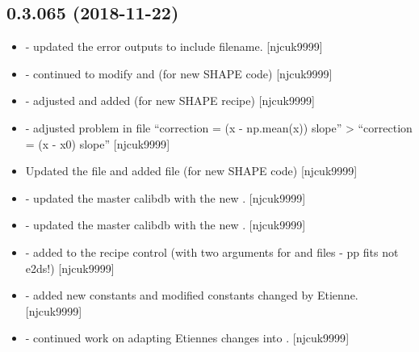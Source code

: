 \documentclass[a4paper,10pt,english]{report}
\begin{document}
\subsection{0.3.065 (2018-11-22)}
\label{\detokenize{misc/changelog:id257}}\begin{itemize}
\item {} 
 - updated the error outputs to include filename.
{[}njcuk9999{]}

\item {} 
 - continued to modify  and 
(for new SHAPE code) {[}njcuk9999{]}

\item {} 
 - adjusted  and added
 (for new SHAPE recipe) {[}njcuk9999{]}

\item {} 
 - adjusted problem in  file “correction = (x
- np.mean(x)) \sphinxtitleref{*} slope” \textendash{}\textgreater{} “correction = (x - x0) \sphinxtitleref{*} slope” {[}njcuk9999{]}

\item {} 
Updated the  file and added  file
(for new SHAPE code) {[}njcuk9999{]}

\item {} 
 - updated the master calibdb with the new
. {[}njcuk9999{]}

\item {} 
 - updated the master calibdb with the new
. {[}njcuk9999{]}

\item {} 
 - added  to the recipe control
(with two arguments for  and  files - pp fits not e2ds!)
{[}njcuk9999{]}

\item {} 
 - added new constants and modified constants
changed by Etienne. {[}njcuk9999{]}

\item {} 
 - continued work on adapting Etiennes changes
into . {[}njcuk9999{]}

\end{itemize}
\end{document}
